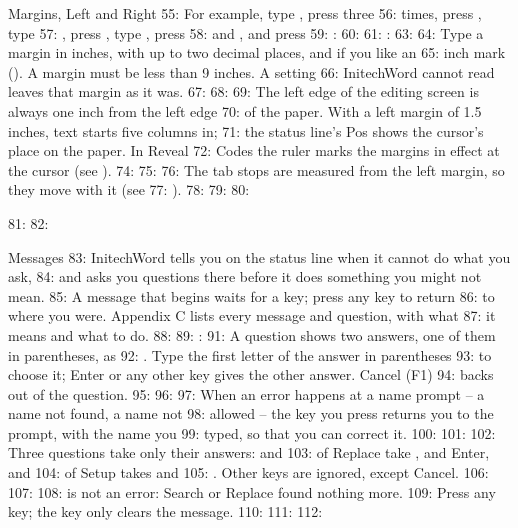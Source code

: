 \begin{Feature}{Margins, Left and Right}
55: For example, type , press  three
56: times, press , type
57: , press , type , press
58:  and , and press
59: :
60: 
61: : 
63: 
64: Type a margin in inches, with up to two decimal places, and if you like an
65: inch mark ().  A margin must be less than 9 inches.  A setting
66: InitechWord cannot read leaves that margin as it was.
67: 
68: 
69: The left edge of the editing screen is always one inch from the left edge
70: of the paper.  With a left margin of 1.5 inches, text starts five columns in;
71: the status line's Pos shows the cursor's place on the paper.  In Reveal
72: Codes the ruler marks the margins in effect at the cursor (see ).
74: 
75: 
76: The tab stops are measured from the left margin, so they move with it (see
77: ).
78: 
79: 
80: \end{Feature}
81: 
82: \begin{Feature}{Messages}
83: InitechWord tells you on the status line when it cannot do what you ask,
84: and asks you questions there before it does something you might not mean.
85: A message that begins  waits for a key; press any key to return
86: to where you were.  Appendix C lists every message and question, with what
87: it means and what to do.
88: 
89: : 
91: A question shows two answers, one of them in parentheses, as
92: .  Type the first letter of the answer in parentheses
93: to choose it; Enter or any other key gives the other answer.  Cancel (F1)
94: backs out of the question.
95: 
96: 
97: When an error happens at a name prompt -- a name not found, a name not
98: allowed -- the key you press returns you to the prompt, with the name you
99: typed, so that you can correct it.
100: 
101: 
102: Three questions take only their answers:  and
103:  of Replace take ,  and Enter, and
104:  of Setup takes  and
105: .  Other keys are ignored, except Cancel.
106: 
107: 
108:  is not an error: Search or Replace found nothing more.
109: Press any key; the key only clears the message.
110: 
111: 
112: \end{Feature}
